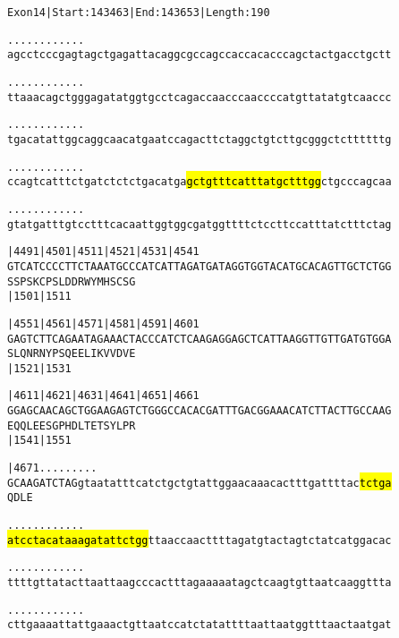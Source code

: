 \documentclass{article}
\begin{document}
\newpage
\begin{alltt}
Exon 14 | Start: 143463 | End: 143653 | Length: 190

.    .    .    .    .    .    .    .    .    .    .    .    
agcctcccgagtagctgagattacaggcgccagccaccacacccagctactgacctgctt

.    .    .    .    .    .    .    .    .    .    .    .    
ttaaacagctgggagatatggtgcctcagaccaacccaaccccatgttatatgtcaaccc

.    .    .    .    .    .    .    .    .    .    .    .    
tgacatattggcaggcaacatgaatccagacttctaggctgtcttgcgggctcttttttg

.    .    .    .    .    .    .    .    .    .    .    .    
ccagtcatttctgatctctctgacatga\hl{gctgtttcatttatgctttgg}ctgcccagcaa

.    .    .    .    .    .    .    .    .    .    .    .    
gtatgatttgtcctttcacaattggtggcgatggttttctccttccatttatctttctag

      |4491     |4501     |4511     |4521     |4531     |4541
GTCATCCCCTTCTAAATGCCCATCATTAGATGATAGGTGGTACATGCACAGTTGCTCTGG
 S  S  P  S  K  C  P  S  L  D  D  R  W  Y  M  H  S  C  S  G 
                |1501                         |1511         

      |4551     |4561     |4571     |4581     |4591     |4601
GAGTCTTCAGAATAGAAACTACCCATCTCAAGAGGAGCTCATTAAGGTTGTTGATGTGGA
 S  L  Q  N  R  N  Y  P  S  Q  E  E  L  I  K  V  V  D  V  E 
                |1521                         |1531         

      |4611     |4621     |4631     |4641     |4651     |4661
GGAGCAACAGCTGGAAGAGTCTGGGCCACACGATTTGACGGAAACATCTTACTTGCCAAG
 E  Q  Q  L  E  E  S  G  P  H  D  L  T  E  T  S  Y  L  P  R 
                |1541                         |1551         

      |4671    .    .    .    .    .    .    .    .    .    
GCAAGATCTAGgtaatatttcatctgctgtattggaacaaacactttgattttac\hl{tctga}
 Q  D  L  E                                                 

.    .    .    .    .    .    .    .    .    .    .    .    
\hl{atcctacataaagatattctgg}ttaaccaacttttagatgtactagtctatcatggacac

.    .    .    .    .    .    .    .    .    .    .    .    
ttttgttatacttaattaagcccactttagaaaaatagctcaagtgttaatcaaggttta

.    .    .    .    .    .    .    .    .    .    .    .    
cttgaaaattattgaaactgttaatccatctatattttaattaatggtttaactaatgat

\end{alltt}
\end{document}
